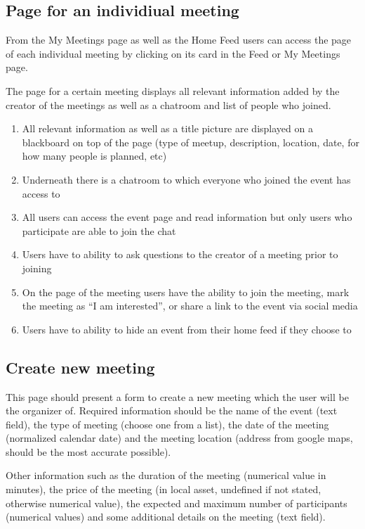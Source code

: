 \documentclass[conference]{IEEEtran}
\begin{document}
\subsection{Page for an individiual meeting}

From the My Meetings page as well as the Home Feed users can access the page of each individual meeting by clicking on its card in the Feed or My Meetings page.

The page for a certain meeting displays all relevant information added by the creator of the meetings as well as a chatroom and list of people who joined.

\begin{enumerate}
\item All relevant information as well as a title picture are displayed on a blackboard on top of the page (type of meetup, description, location, date, for how many people is planned, etc)
\item Underneath there is a chatroom to which everyone who joined the event has access to
\item All users can access the event page and read information but only users who participate are able to join the chat
\item Users have to ability to ask questions to the creator of a meeting prior to joining
\item On the page of the meeting users have the ability to join the meeting, mark the meeting as “I am interested”, or share a link to the event via social media
\item Users have to ability to hide an event from their home feed if they choose to
\end{enumerate}

\subsection{Create new meeting}

This page should present a form to create a new meeting
which the user will be the organizer of. Required information should be the name of the event (text field), the type of meeting (choose one from a list), the date of the meeting (normalized calendar date) and the meeting location (address from google maps, should be the most accurate possible).

Other information such as the duration of the meeting (numerical value in minutes), the price of the meeting (in local asset, undefined if not stated, otherwise numerical value), the expected and maximum number of participants (numerical values) and some additional details on the meeting (text field).
\end{document}
